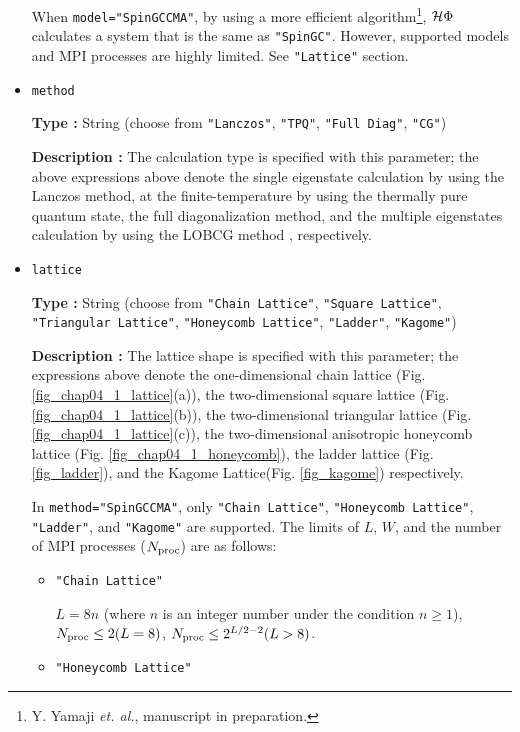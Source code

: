 \begin{itemize}
When \verb|model="SpinGCCMA"|,
by using a more efficient algorithm\footnote{Y. Yamaji \textit{et. al.}, manuscript in preparation.}, 
$\mathcal{H} \Phi$ calculates a system that is the same as \verb|"SpinGC"|.
However, supported models and MPI processes are highly limited.
See \verb|"Lattice"| section.

\item \verb|method|
  
{\bf Type :} String (choose from \verb|"Lanczos"|, \verb|"TPQ"|, \verb|"Full Diag"|, \verb|"CG"|)

{\bf Description :} The calculation type is specified with this parameter;
the above expressions above denote 
the single eigenstate calculation by using the Lanczos method,
at the finite-temperature by using the thermally pure quantum state,
the full diagonalization method,
and the multiple eigenstates calculation by using the LOBCG method
\cite{doi:10.1137/S1064827500366124,transactionJSCES2006},
respectively.

\item \verb|lattice|

{\bf Type :} String (choose from \verb|"Chain Lattice"|, \verb|"Square Lattice"|, 
\verb|"Triangular Lattice"|, \verb|"Honeycomb Lattice"|, \verb|"Ladder"|, \verb|"Kagome"|)

{\bf Description :} The lattice shape is specified with this parameter;
the expressions above denote
the one-dimensional chain lattice (Fig. \ref{fig_chap04_1_lattice}(a)), 
the two-dimensional square lattice (Fig. \ref{fig_chap04_1_lattice}(b)),
the two-dimensional triangular lattice (Fig. \ref{fig_chap04_1_lattice}(c)),
the two-dimensional anisotropic honeycomb lattice (Fig. \ref{fig_chap04_1_honeycomb}),
the ladder lattice (Fig. \ref{fig_ladder}),
and
the Kagome Lattice(Fig. \ref{fig_kagome})
respectively.

In \verb|method="SpinGCCMA"|,
only \verb|"Chain Lattice"|, \verb|"Honeycomb Lattice"|, 
\verb|"Ladder"|, and \verb|"Kagome"| are supported.
The limits of $L$, $W$, and the number of MPI processes ($N_{\rm proc}$) are as follows:

\begin{itemize}

  \item \verb|"Chain Lattice"|

    $L = 8n$ (where $n$ is an integer number under the condition  $n\geq1$),
    $N_{\rm proc} \leq 2(L=8)$, $N_{\rm proc} \leq 2^{L/2-2}(L>8)$.
    
  \item \verb|"Honeycomb Lattice"|


\end{itemize}
\end{itemize}
